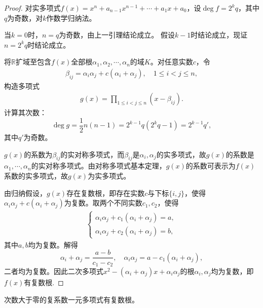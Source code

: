 \documentclass[../../main.tex]{subfiles}%
\begin{document}
\begin{proof}
对实多项式$f(x)=x^n+a_{n-1}x^{n-1}+\cdots+a_1x+a_0$，设$\deg f=2^k q$，其中$q$为奇数，对$k$作数学归纳法。

当$k=0$时，$n=q$为奇数，由上一引理结论成立。
假设$k-1$时结论成立，现证$n=2^k q$时结论成立。

将$\mathbb{R}$扩域至包含$f(x)$全部根$\alpha_1,\alpha_2,\cdots,\alpha_n$的域$K$。对任意实数$c$，令
\begin{align}
\beta_{ij}=\alpha_i\alpha_j+c(\alpha_i+\alpha_j),\quad 1\leqslant i<j\leqslant n,\label{eq:beta-def}
\end{align}
构造多项式
\begin{align}
g(x)=\prod\limits_{1\leqslant i<j\leqslant n}(x-\beta_{ij}).\label{eq:g-poly}
\end{align}
计算其次数：
$$\deg g=\frac12 n(n-1)=2^{k-1}q(2^k q-1)=2^{k-1}q',$$
其中$q'$为奇数。

$g(x)$的系数为$\beta_{ij}$的实对称多项式，而$\beta_{ij}$是$\alpha_i,\alpha_j$的实多项式，故$g(x)$的系数是$\alpha_1,\cdots,\alpha_n$的实对称多项式。由对称多项式基本定理，$g(x)$的系数可表示为$f(x)$系数的实多项式，故$g(x)$为实多项式。

由归纳假设，$g(x)$存在复数根，即存在实数$c$与下标$\{i,j\}$，使得$\alpha_i\alpha_j+c(\alpha_i+\alpha_j)$为复数。取两个不同实数$c_1,c_2$，使得
\begin{align}
\begin{cases}
\alpha_i\alpha_j+c_1(\alpha_i+\alpha_j)=a,\\
\alpha_i\alpha_j+c_2(\alpha_i+\alpha_j)=b,
\end{cases}\label{eq:sys-ab}
\end{align}
其中$a,b$均为复数。解得
$$\alpha_i+\alpha_j=\frac{a-b}{c_1-c_2},\quad \alpha_i\alpha_j=a-c_1(\alpha_i+\alpha_j),$$
二者均为复数。因此二次多项式$x^2-(\alpha_i+\alpha_j)x+\alpha_i\alpha_j$的根$\alpha_i,\alpha_j$均为复数，即$f(x)$有复数根.
\end{proof}

\begin{theorem}
次数大于零的复系数一元多项式有复数根。
\end{theorem}
\end{document}
